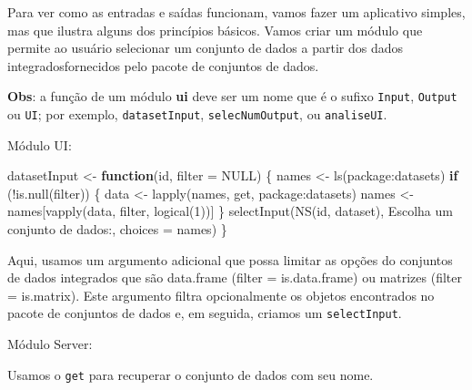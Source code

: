 \documentclass[
]{book}
\newenvironment{Shaded}{\begin{snugshade}}{\end{snugshade}}
\newcommand{\AttributeTok}[1]{\textcolor[rgb]{0.77,0.63,0.00}{#1}}
\newcommand{\ConstantTok}[1]{\textcolor[rgb]{0.00,0.00,0.00}{#1}}
\newcommand{\ControlFlowTok}[1]{\textcolor[rgb]{0.13,0.29,0.53}{\textbf{#1}}}
\newcommand{\DecValTok}[1]{\textcolor[rgb]{0.00,0.00,0.81}{#1}}
\newcommand{\FunctionTok}[1]{\textcolor[rgb]{0.00,0.00,0.00}{#1}}
\newcommand{\NormalTok}[1]{#1}
\newcommand{\OtherTok}[1]{\textcolor[rgb]{0.56,0.35,0.01}{#1}}
\newcommand{\SpecialCharTok}[1]{\textcolor[rgb]{0.00,0.00,0.00}{#1}}
\newcommand{\StringTok}[1]{\textcolor[rgb]{0.31,0.60,0.02}{#1}}
\begin{document}
Para ver como as entradas e saídas funcionam, vamos fazer um aplicativo simples, mas que ilustra alguns dos princípios básicos. Vamos criar um módulo que permite ao usuário selecionar um conjunto de dados a partir dos dados integradosfornecidos pelo pacote de conjuntos de dados.

\textbf{Obs}: a função de um módulo \textbf{ui} deve ser um nome que é o sufixo \texttt{Input}, \texttt{Output} ou \texttt{UI}; por exemplo, \texttt{datasetInput}, \texttt{selecNumOutput}, ou \texttt{analiseUI}.

Módulo UI:

\begin{Shaded}
\begin{Highlighting}[]
\NormalTok{datasetInput }\OtherTok{\textless{}{-}} \ControlFlowTok{function}\NormalTok{(id, }\AttributeTok{filter =} \ConstantTok{NULL}\NormalTok{) \{}
\NormalTok{  names }\OtherTok{\textless{}{-}} \FunctionTok{ls}\NormalTok{(}\StringTok{\textquotesingle{}package:datasets\textquotesingle{}}\NormalTok{)}
  \ControlFlowTok{if}\NormalTok{ (}\SpecialCharTok{!}\FunctionTok{is.null}\NormalTok{(filter)) \{}
\NormalTok{    data }\OtherTok{\textless{}{-}} \FunctionTok{lapply}\NormalTok{(names, get, }\StringTok{\textquotesingle{}package:datasets\textquotesingle{}}\NormalTok{)}
\NormalTok{    names }\OtherTok{\textless{}{-}}\NormalTok{ names[}\FunctionTok{vapply}\NormalTok{(data, filter, }\FunctionTok{logical}\NormalTok{(}\DecValTok{1}\NormalTok{))]}
\NormalTok{  \}}
  \FunctionTok{selectInput}\NormalTok{(}\FunctionTok{NS}\NormalTok{(id, }\StringTok{\textquotesingle{}dataset\textquotesingle{}}\NormalTok{), }\StringTok{\textquotesingle{}Escolha um conjunto de dados:\textquotesingle{}}\NormalTok{, }\AttributeTok{choices =}\NormalTok{ names)}
\NormalTok{\}}
\end{Highlighting}
\end{Shaded}

Aqui, usamos um argumento adicional que possa limitar as opções do conjuntos de dados integrados que são data.frame (filter = is.data.frame) ou matrizes (filter = is.matrix). Este argumento filtra opcionalmente os objetos encontrados no pacote de conjuntos de dados e, em seguida, criamos um \texttt{selectInput}.

Módulo Server:

Usamos o \texttt{get} para recuperar o conjunto de dados com seu nome.

\begin{Shaded}
\end{Shaded}
\end{document}
